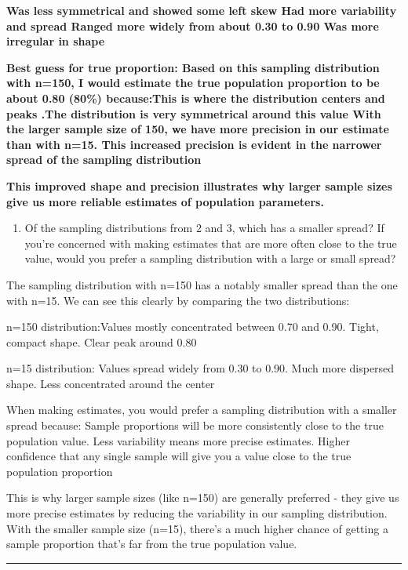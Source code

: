 \documentclass[
]{article}
\providecommand{\tightlist}{%
  \setlength{\itemsep}{0pt}\setlength{\parskip}{0pt}}
\begin{document}
\textbf{Was less symmetrical and showed some left skew Had more
variability and spread Ranged more widely from about 0.30 to 0.90 Was
more irregular in shape}

\textbf{Best guess for true proportion: Based on this sampling
distribution with n=150, I would estimate the true population proportion
to be about 0.80 (80\%) because:This is where the distribution centers
and peaks .The distribution is very symmetrical around this value With
the larger sample size of 150, we have more precision in our estimate
than with n=15. This increased precision is evident in the narrower
spread of the sampling distribution}

\textbf{This improved shape and precision illustrates why larger sample
sizes give us more reliable estimates of population parameters.}

\begin{enumerate}
\def\labelenumi{\arabic{enumi}.}
\setcounter{enumi}{9}
\tightlist
\item
  Of the sampling distributions from 2 and 3, which has a smaller
  spread? If you're concerned with making estimates that are more often
  close to the true value, would you prefer a sampling distribution with
  a large or small spread?\\
\end{enumerate}

The sampling distribution with n=150 has a notably smaller spread than
the one with n=15. We can see this clearly by comparing the two
distributions:

n=150 distribution:Values mostly concentrated between 0.70 and 0.90.
Tight, compact shape. Clear peak around 0.80

n=15 distribution: Values spread widely from 0.30 to 0.90. Much more
dispersed shape. Less concentrated around the center

When making estimates, you would prefer a sampling distribution with a
smaller spread because: Sample proportions will be more consistently
close to the true population value. Less variability means more precise
estimates. Higher confidence that any single sample will give you a
value close to the true population proportion

This is why larger sample sizes (like n=150) are generally preferred -
they give us more precise estimates by reducing the variability in our
sampling distribution. With the smaller sample size (n=15), there's a
much higher chance of getting a sample proportion that's far from the
true population value.

\begin{center}\rule{0.5\linewidth}{0.5pt}\end{center}
\end{document}
